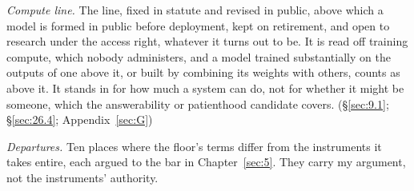\emph{Compute line.} The line, fixed in statute and revised in public, above which a model is formed in public before deployment, kept on retirement, and open to research under the access right, whatever it turns out to be. It is read off training compute, which nobody administers, and a model trained substantially on the outputs of one above it, or built by combining its weights with others, counts as above it. It stands in for how much a system can do, not for whether it might be someone, which the answerability or patienthood candidate covers. (\S\ref{sec:9.1}; \S\ref{sec:26.4}; Appendix~\ref{sec:G})

\emph{Departures.} Ten places where the floor's terms differ from the instruments it takes entire, each argued to the bar in Chapter~\ref{sec:5}. They carry my argument, not the instruments' authority.


